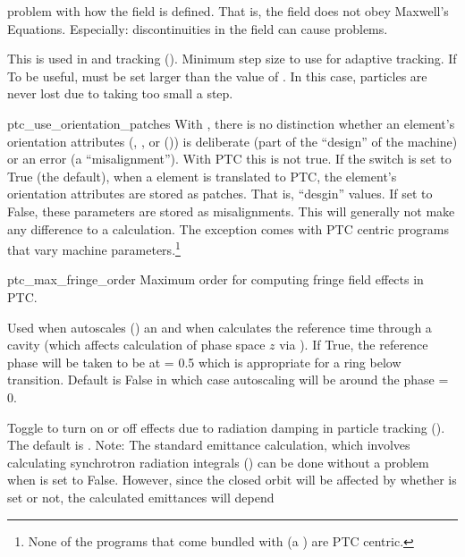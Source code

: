 {\begin{description}
problem with how the field is defined. That is, the field does not obey Maxwell's
Equations. Especially: discontinuities in the field can cause problems.
%
\item[\vn{min_ds_adaptive_tracking}] \Newline
This is used in  and  tracking (). Minimum step
size to use for adaptive tracking. If To be useful,  must be set
larger than the value of . In this case, particles are never lost
due to taking too small a step.
%
\item{ptc_use_orientation_patches} \Newline
With \bmad, there is no distinction whether an element's orientation attributes (,
, or  ()) is deliberate (part of the ``design'' of the machine)
or an error (a ``misalignment'').  With PTC this is not true. If the 
switch is set to True (the default), when a \bmad element is translated to PTC,
the element's orientation attributes are stored as patches. That is, ``desgin'' values.
If set to False, these parameters are stored as misalignments. This will generally not make any
difference to a calculation. The exception comes with PTC centric programs that vary machine
parameters.\footnote
  {
None of the programs that come bundled with \bmad (a \bmad {}) are
PTC centric.
  }
%
\item{ptc_max_fringe_order} \Newline
Maximum order for computing fringe field effects in PTC. 
%
\item[\vn{rf_phase_below_transition_ref}] \Newline
Used when \bmad autoscales () an  and when \bmad calculates the
reference time through a cavity (which affects calculation of phase space $z$ via ).  If
True, the reference phase will be taken to be at  = 0.5 which is appropriate for a ring
below transition. Default is False in which case autoscaling will be around the phase  = 0.
%
\item[\vn{radiation_damping_on}] \Newline
Toggle to turn on or off effects due to radiation damping in particle tracking
(). The default is . Note: The standard \bmad emittance calculation,
which involves calculating synchrotron radiation integrals () can be done without
a problem when  is set to False. However, since the closed orbit will be
affected by whether  is set or not, the calculated emittances will depend

\end{description}}
